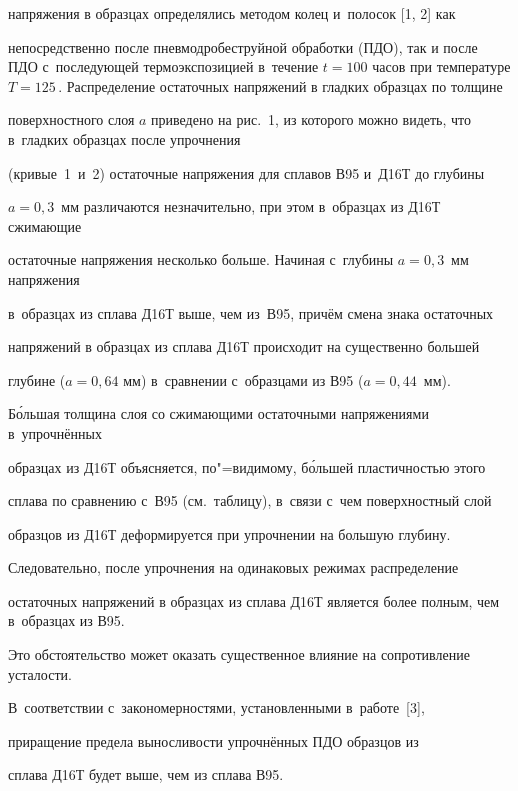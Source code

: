 напряжения в образцах определялись методом колец и~полосок [1, 2] как

непосредственно после пневмодробеструйной обработки (ПДО), так и после ПДО с~последующей термоэкспозицией в~течение $t=100$ часов при температуре $T=125$\,\textcelsius. Распределение остаточных напряжений в гладких образцах по толщине

поверхностного слоя $a$ приведено на рис.~1, из которого можно видеть, что в~гладких образцах после упрочнения

(кривые~1~и~2) остаточные напряжения для сплавов В95 и~Д16Т до глубины

$a=0,3$~мм различаются незначительно, при этом в~образцах из Д16Т сжимающие

остаточные напряжения несколько больше. Начиная с~глубины $a=0,3$~мм напряжения

в~образцах из сплава Д16Т выше, чем из~В95, причём смена знака остаточных

напряжений в образцах из сплава Д16Т происходит на существенно большей

глубине ($a=0,64$ мм) в~сравнении с~образцами из В95 ($a=0,44$~мм).











Б\'ольшая толщина слоя со сжимающими остаточными напряжениями в~уп\-роч\-нён\-ных

образцах из Д16Т объясняется, по"=видимому, б\'ольшей пластичностью этого

сплава по сравнению с~В95 (см.~таблицу), в~связи с~чем поверхностный слой

образцов из Д16Т деформируется при упрочнении на большую глубину.



Следовательно, после упрочнения на одинаковых режимах распределение

остаточных напряжений в образцах из сплава Д16Т является более полным, чем в~образцах из В95.

Это обстоятельство может оказать существенное влияние на сопротивление усталости.

В~соответствии с~закономерностями, установленными в~работе~[3],

приращение предела выносливости упрочнённых ПДО образцов из

сплава Д16Т будет выше, чем из сплава В95.







